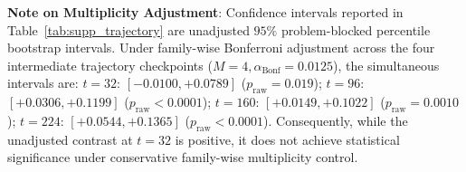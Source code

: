 \documentclass[11pt]{article}
\begin{document}
\noindent\textbf{Note on Multiplicity Adjustment}: Confidence intervals reported in Table~\ref{tab:supp_trajectory} are unadjusted $95\%$ problem-blocked percentile bootstrap intervals. Under family-wise Bonferroni adjustment across the four intermediate trajectory checkpoints ($M=4, \alpha_{\text{Bonf}}=0.0125$), the simultaneous intervals are: $t=32$: $[-0.0100, +0.0789]$ ($p_{\text{raw}}=0.019$); $t=96$: $[+0.0306, +0.1199]$ ($p_{\text{raw}}<0.0001$); $t=160$: $[+0.0149, +0.1022]$ ($p_{\text{raw}}=0.0010$); $t=224$: $[+0.0544, +0.1365]$ ($p_{\text{raw}}<0.0001$). Consequently, while the unadjusted contrast at $t=32$ is positive, it does not achieve statistical significance under conservative family-wise multiplicity control.
\end{document}
